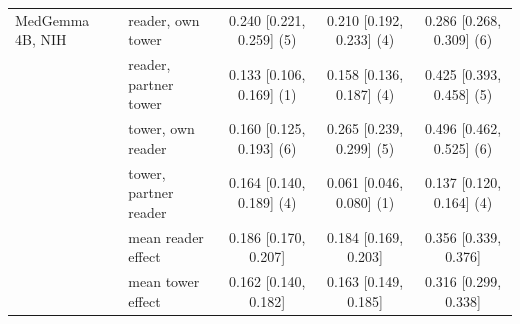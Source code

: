 \begin{table}[htbp]
\begin{tabular}{llccc}
\addlinespace
MedGemma 4B, NIH & reader, own tower & 0.240 [0.221, 0.259] (5) & 0.210 [0.192, 0.233] (4) & 0.286 [0.268, 0.309] (6) \\
 & reader, partner tower & 0.133 [0.106, 0.169] (1) & 0.158 [0.136, 0.187] (4) & 0.425 [0.393, 0.458] (5) \\
 & tower, own reader & 0.160 [0.125, 0.193] (6) & 0.265 [0.239, 0.299] (5) & 0.496 [0.462, 0.525] (6) \\
 & tower, partner reader & 0.164 [0.140, 0.189] (4) & 0.061 [0.046, 0.080] (1) & 0.137 [0.120, 0.164] (4) \\
 & \quad mean reader effect & 0.186 [0.170, 0.207] & 0.184 [0.169, 0.203] & 0.356 [0.339, 0.376] \\
 & \quad mean tower effect & 0.162 [0.140, 0.182] & 0.163 [0.149, 0.185] & 0.316 [0.299, 0.338] \\
\bottomrule
\end{tabular}
\end{table}
